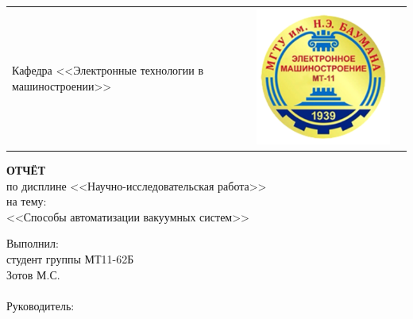 \begin{titlepage}
\begin{center}
\begin{tabular}{C{3cm}C{10cm}C{3cm}}
{		Кафедра <<Электронные технологии в машиностроении>>}&\includegraphics[width=\linewidth]{images/titul/mt11.png}
	\end{tabular}
\end{center}
		\vspace{2em}
		\begin{center}
			{\Large \bfseries ОТЧЁТ}\\
			по дисплине
			<<Научно-исследовательская работа>>\\
			на тему:\\
			<<Способы автоматизации вакуумных систем>>
		\end{center}
		\vspace{1em}
		\newbox{\lbox}
		\newlength{\maxl}
		\setlength{\maxl}{\wd\lbox}
		\hfill\parbox{11cm}
		{
			\hspace*{5cm}Выполнил:\hfill\\
			\hspace*{5cm}студент группы МТ11-62Б \hfill\\
			\hspace*{5cm}Зотов М.С.\hfill\\\\
			\hspace*{5cm}Руководитель:\hfill\\
}
\end{titlepage}
